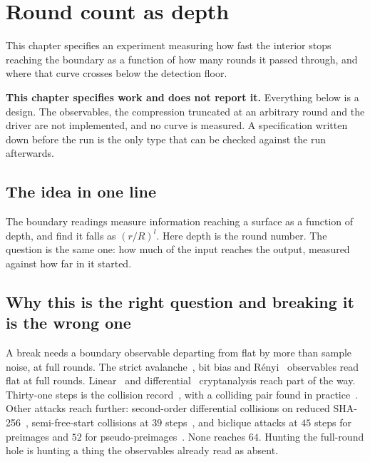 \chapter{Round count as depth}

This chapter specifies an experiment measuring how fast the interior stops reaching the boundary as a function of how many rounds it passed through, and where that curve crosses below the detection floor.

\textbf{This chapter specifies work and does not report it.} Everything below is a design. The observables, the compression truncated at an arbitrary round and the driver are not implemented, and no curve is measured. A specification written down before the run is the only type that can be checked against the run afterwards.

\section{The idea in one line}

The boundary readings measure information reaching a surface as a function of depth, and find it falls as \((r/R)^l\). Here depth is the round number. The question is the same one: how much of the input reaches the output, measured against how far in it started.

\section{Why this is the right question and breaking it is the wrong one}

A break needs a boundary observable departing from flat by more than sample noise, at full rounds. The strict avalanche~\cite{src:Webster-and-Tavares-1986}, bit bias and Rényi~\cite{src:Renyi} observables read flat at full rounds. Linear~\cite{src:Matsui-1994} and differential~\cite{src:Biham-and-Shamir-1991} cryptanalysis reach part of the way. Thirty-one steps is the collision record~\cite{src:Mendel-Nad-and-Schlaffer-2015}, with a colliding pair found in practice~\cite{src:Li-Liu-Wang-Dong-and-Sun-2024}. Other attacks reach further: second-order differential collisions on reduced SHA-256~\cite{src:Biryukov-Lamberger-Mendel-and-Nikolic-2011}, semi-free-start collisions at \(39\) steps~\cite{src:Li-Liu-and-Wang-2024}, and biclique attacks at \(45\) steps for preimages and \(52\) for pseudo-preimages~\cite{src:Khovratovich-Rechberger-and-Savelieva-2012}. None reaches \(64\). Hunting the full-round hole is hunting a thing the observables already read as absent.


